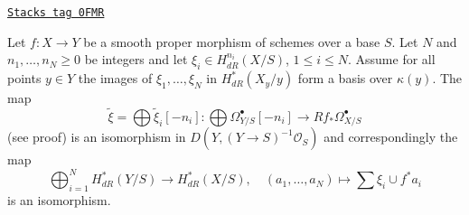 \begin{proposition}
\label{derham-proposition-global-generation-on-fibres}
\href{https://stacks.math.columbia.edu/tag/0FMR}{\texttt{Stacks tag 0FMR}}

Let $f : X \to Y$ be a smooth proper morphism of schemes over a base $S$.
Let $N$ and $n_1, \ldots, n_N \geq 0$ be integers and let
$\xi_i \in H^{n_i}_{dR}(X/S)$, $1 \leq i \leq N$.
Assume for all points $y \in Y$ the images of $\xi_1, \ldots, \xi_N$
in $H^*_{dR}(X_y/y)$ form a basis over $\kappa(y)$. The map
$$
\tilde \xi = \bigoplus \tilde \xi_i[-n_i] :
\bigoplus \Omega^\bullet_{Y/S}[-n_i]
\longrightarrow
Rf_*\Omega^\bullet_{X/S}
$$
(see proof) is an isomorphism in $D(Y, (Y \to S)^{-1}\mathcal{O}_S)$ and
correspondingly the map
$$
\bigoplus\nolimits_{i = 1}^N H^*_{dR}(Y/S) \longrightarrow
H^*_{dR}(X/S), \quad
(a_1, \ldots, a_N) \longmapsto  \sum \xi_i \cup f^*a_i
$$
is an isomorphism.
\end{proposition}

